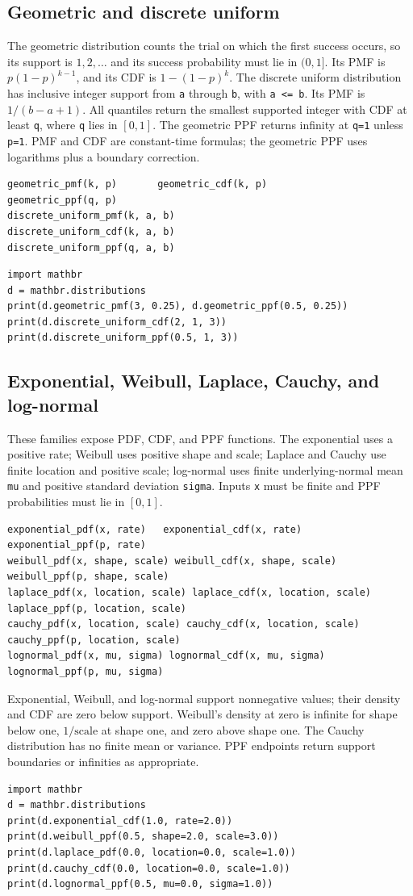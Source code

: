 \documentclass[11pt,a4paper]{article}
\begin{document}
\subsection{Geometric and discrete uniform}
The geometric distribution counts the trial on which the first success occurs, so its support is $1,2,\ldots$ and its success probability must lie in $(0,1]$. Its PMF is $p(1-p)^{k-1}$, and its CDF is $1-(1-p)^k$. The discrete uniform distribution has inclusive integer support from \verb|a| through \verb|b|, with \verb|a <= b|. Its PMF is $1/(b-a+1)$. All quantiles return the smallest supported integer with CDF at least \verb|q|, where \verb|q| lies in $[0,1]$. The geometric PPF returns infinity at \verb|q=1| unless \verb|p=1|. PMF and CDF are constant-time formulas; the geometric PPF uses logarithms plus a boundary correction.
\begin{verbatim}
geometric_pmf(k, p)       geometric_cdf(k, p)
geometric_ppf(q, p)
discrete_uniform_pmf(k, a, b)
discrete_uniform_cdf(k, a, b)
discrete_uniform_ppf(q, a, b)
\end{verbatim}
\begin{verbatim}
import mathbr
d = mathbr.distributions
print(d.geometric_pmf(3, 0.25), d.geometric_ppf(0.5, 0.25))
print(d.discrete_uniform_cdf(2, 1, 3))
print(d.discrete_uniform_ppf(0.5, 1, 3))
\end{verbatim}

\subsection{Exponential, Weibull, Laplace, Cauchy, and log-normal}
These families expose PDF, CDF, and PPF functions. The exponential uses a positive rate; Weibull uses positive shape and scale; Laplace and Cauchy use finite location and positive scale; log-normal uses finite underlying-normal mean \verb|mu| and positive standard deviation \verb|sigma|. Inputs \verb|x| must be finite and PPF probabilities must lie in $[0,1]$.
\begin{verbatim}
exponential_pdf(x, rate)   exponential_cdf(x, rate)
exponential_ppf(p, rate)
weibull_pdf(x, shape, scale) weibull_cdf(x, shape, scale)
weibull_ppf(p, shape, scale)
laplace_pdf(x, location, scale) laplace_cdf(x, location, scale)
laplace_ppf(p, location, scale)
cauchy_pdf(x, location, scale) cauchy_cdf(x, location, scale)
cauchy_ppf(p, location, scale)
lognormal_pdf(x, mu, sigma) lognormal_cdf(x, mu, sigma)
lognormal_ppf(p, mu, sigma)
\end{verbatim}
Exponential, Weibull, and log-normal support nonnegative values; their density and CDF are zero below support. Weibull's density at zero is infinite for shape below one, $1/\mathrm{scale}$ at shape one, and zero above shape one. The Cauchy distribution has no finite mean or variance. PPF endpoints return support boundaries or infinities as appropriate.
\begin{verbatim}
import mathbr
d = mathbr.distributions
print(d.exponential_cdf(1.0, rate=2.0))
print(d.weibull_ppf(0.5, shape=2.0, scale=3.0))
print(d.laplace_pdf(0.0, location=0.0, scale=1.0))
print(d.cauchy_cdf(0.0, location=0.0, scale=1.0))
print(d.lognormal_ppf(0.5, mu=0.0, sigma=1.0))
\end{verbatim}
\end{document}
